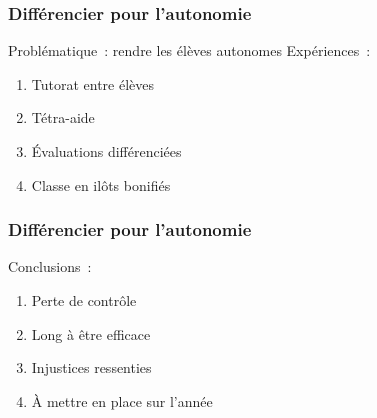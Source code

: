 
\begin{frame}
    \frametitle{Différencier pour l'autonomie}
    Problématique : rendre les élèves autonomes
    Expériences :
    \begin{enumerate}
        \item Tutorat entre élèves
        \item Tétra-aide
        \item Évaluations différenciées
        \item Classe en ilôts bonifiés
    \end{enumerate}
\end{frame}

\begin{frame}
    \frametitle{Différencier pour l'autonomie}
    Conclusions :
    \begin{enumerate}
        \item Perte de contrôle
        \item Long à être efficace
        \item Injustices ressenties
        \item À mettre en place sur l'année
    \end{enumerate}
\end{frame}
